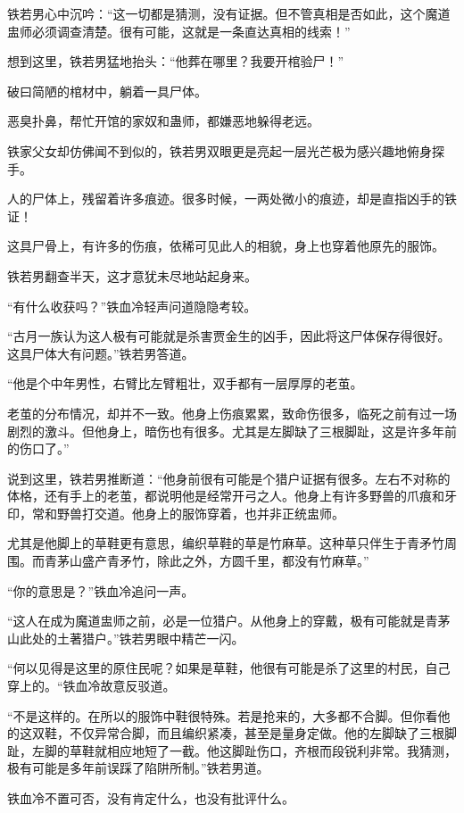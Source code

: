\begin{this_body}
铁若男心中沉吟：“这一切都是猜测，没有证据。但不管真相是否如此，这个魔道盅师必须调查清楚。很有可能，这就是一条直达真相的线索！”

想到这里，铁若男猛地抬头：“他葬在哪里？我要开棺验尸！”

破曰简陋的棺材中，躺着一具尸体。

恶臭扑鼻，帮忙开馆的家奴和蛊师，都嫌恶地躲得老远。

铁家父女却仿佛闻不到似的，铁若男双眼更是亮起一层光芒极为感兴趣地俯身探手。

人的尸体上，残留着许多痕迹。很多时候，一两处微小的痕迹，却是直指凶手的铁证！

这具尸骨上，有许多的伤痕，依稀可见此人的相貌，身上也穿着他原先的服饰。

铁若男翻查半天，这才意犹未尽地站起身来。

“有什么收获吗？”铁血冷轻声问道隐隐考较。

“古月一族认为这人极有可能就是杀害贾金生的凶手，因此将这尸体保存得很好。这具尸体大有问题。”铁若男答道。

“他是个中年男性，右臂比左臂粗壮，双手都有一层厚厚的老茧。

老茧的分布情况，却并不一致。他身上伤痕累累，致命伤很多，临死之前有过一场剧烈的激斗。但他身上，暗伤也有很多。尤其是左脚缺了三根脚趾，这是许多年前的伤口了。”

说到这里，铁若男推断道：“他身前很有可能是个猎户证据有很多。左右不对称的体格，还有手上的老茧，都说明他是经常开弓之人。他身上有许多野兽的爪痕和牙印，常和野兽打交道。他身上的服饰穿着，也并非正统盅师。

尤其是他脚上的草鞋更有意思，编织草鞋的草是竹麻草。这种草只伴生于青矛竹周围。而青茅山盛产青矛竹，除此之外，方圆千里，都没有竹麻草。”

“你的意思是？”铁血冷追问一声。

“这人在成为魔道盅师之前，必是一位猎户。从他身上的穿戴，极有可能就是青茅山此处的土著猎户。”铁若男眼中精芒一闪。

“何以见得是这里的原住民呢？如果是草鞋，他很有可能是杀了这里的村民，自己穿上的。“铁血冷故意反驳道。

“不是这样的。在所以的服饰中鞋很特殊。若是抢来的，大多都不合脚。但你看他的这双鞋，不仅异常合脚，而且编织紧凑，甚至是量身定做。他的左脚缺了三根脚趾，左脚的草鞋就相应地短了一截。他这脚趾伤口，齐根而段锐利非常。我猜测，极有可能是多年前误踩了陷阱所制。”铁若男道。

铁血冷不置可否，没有肯定什么，也没有批评什么。


\end{this_body}
